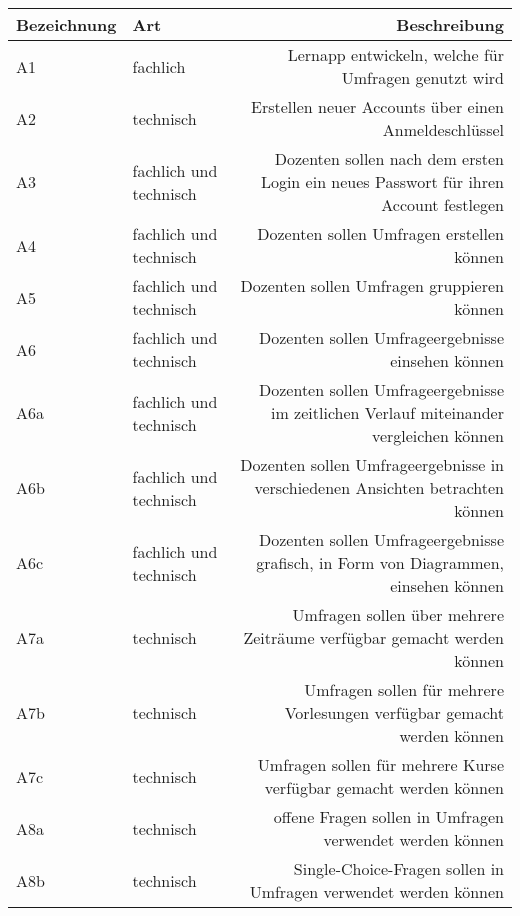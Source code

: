 \begin{table}[!htbp]
    \centering
    \begin{tabularx}{\textwidth}{|l|k|r|}
      \hline
      {Bezeichnung} & {Art} & {Beschreibung} \\
      \hline \hline
      {\label{Anf:A1}A1} & fachlich & Lernapp entwickeln, welche für Umfragen genutzt wird \\
      \hline
      {\label{Anf:A2}A2} & technisch & Erstellen neuer Accounts über einen Anmeldeschlüssel \\
      \hline
      {\label{Anf:A3}A3} & fachlich und technisch & Dozenten sollen nach dem ersten Login ein neues Passwort für ihren Account festlegen \\
      \hline
      {\label{Anf:A4}A4} & fachlich und technisch & Dozenten sollen Umfragen erstellen können\\
      \hline
      {\label{Anf:A5}A5} & fachlich und technisch & Dozenten sollen Umfragen gruppieren können\\
      \hline
      {\label{Anf:A6}A6} & fachlich und technisch & Dozenten sollen Umfrageergebnisse einsehen können\\
      \hline
      {\label{Anf:A6a}A6a} & fachlich und technisch & Dozenten sollen Umfrageergebnisse im zeitlichen Verlauf miteinander vergleichen können\\
      \hline
      {\label{Anf:A6b}A6b} & fachlich und technisch & Dozenten sollen Umfrageergebnisse in verschiedenen Ansichten betrachten können\\
      \hline
      {\label{Anf:A6c}A6c} & fachlich und technisch & Dozenten sollen Umfrageergebnisse grafisch, in Form von Diagrammen, einsehen können\\
      \hline
      {\label{Anf:A7a}A7a} & technisch & Umfragen sollen über mehrere Zeiträume verfügbar gemacht werden können \\
      \hline
      {\label{Anf:A7b}A7b} & technisch & Umfragen sollen für mehrere Vorlesungen verfügbar gemacht werden können \\
      \hline
      {\label{Anf:A7c}A7c} & technisch & Umfragen sollen für mehrere Kurse verfügbar gemacht werden können \\
      \hline
      {\label{Anf:A8a}A8a} & technisch & offene Fragen sollen in Umfragen verwendet werden können \\
      \hline
      {\label{Anf:A8b}A8b} & technisch & Single-Choice-Fragen sollen in Umfragen verwendet werden können \\

\end{tabularx}
\end{table}
